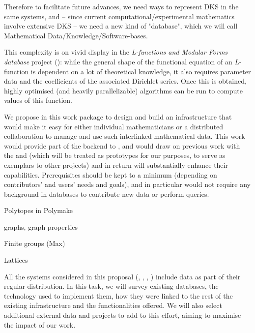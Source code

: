 \begin{workpackage}[id=dksbases,wphases=1-48!.5,
  title=Data/Knowledge/Software-Bases,lead=JU,
  ZHRM=12,JURM=36,USHRM=12,UWRM=25,SARM=10,LLRM=2,PSRM=4]
\begin{wpdescription}
  Therefore to facilitate future advances, we need ways to represent DKS in the same
  systems, and -- since current computational/experimental mathematics involve extensive
  DKS -- we need a new kind of "database", which we will call Mathematical
  Data/Knowledge/Software-bases.

  This complexity is on vivid display in the \emph{L-functions and Modular Forms database}
  project (\LMFDB): while the general shape of the functional equation of an $L$-function
  is dependent on a lot of theoretical knowledge, it also requires parameter data and the
  coefficients of the associated Dirichlet series. Once this is obtained, highly optimised
  (and heavily parallelizable) algorithms can be run to compute values of this function.

  We propose in this work package to design and build an infrastructure that would make it
  easy for either individual mathematicians or a distributed collaboration to manage and
  use such interlinked mathematical data. This work would provide part of the backend to
  , and would draw on previous work
  with the \LMFDB and \FindStat (which will be treated as prototypes for our purposes, to
  serve as exemplars to other projects) and in return will substantially enhance their
  capabilities. Prerequisites should be kept to a minimum (depending on contributors' and
  users' needs and goals), and in particular would not require any background in databases
  to contribute new data or perform queries.
  
      \begin{compactitem}
     \item Polytopes in Polymake
     \item graphs, graph properties
     \item Finite groups (Max)
     \item Lattices
     \end{compactitem}
\end{wpdescription}

\begin{tasklist}
\begin{task}[title=Survey of existing databases,id=data-assessment,
  lead=ZH,partners={JU,SA,UW,US}]
  All the systems considered in this proposal (\GAP, \Sage, \Pari, \Singular) include data
  as part of their regular distribution. In this task, we will survey existing databases,
  the technology used to implement them, how they were linked to the rest of the existing
  infrastructure and the functionalities offered. We will also select additional external
  data and projects to add to this effort, aiming to maximise the impact of our work.
\end{task}


\end{tasklist}
\end{workpackage}
